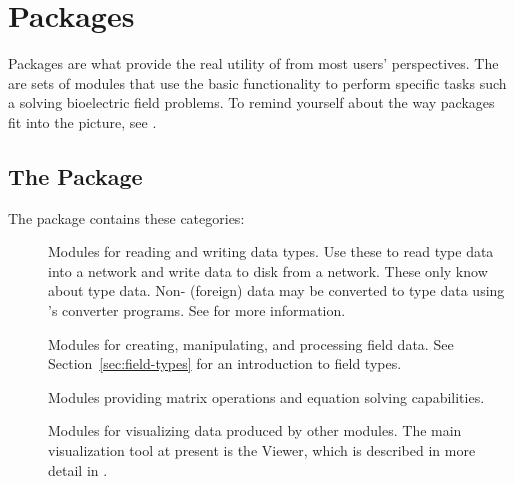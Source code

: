 %
%
%
%
%
%
\section{Packages}
\label{sec:packages}

Packages are what provide the real utility of \SR{} from most users'
perspectives.  The are sets of modules that use the basic \SR{}
functionality to perform specific tasks such a solving bioelectric field
problems.  To remind yourself about the way packages fit into the picture,
see .

\subsection{The \sr{} Package}
\label{sec:srpackage}


The \sr{} package contains these categories:

\begin{description}

\item[] Modules for reading and writing \sr{}
  data types.  Use these to read \sr{} type data into a network and write
  data to disk from a network.  These only know about \sr{} type data.
  Non-\sr{} (foreign) data may be converted to \sr{} type data using
  \sr{}'s converter programs.  See  for more information.

\item[] Modules for creating,
  manipulating, and processing field data.
  See Section~\ref{sec:field-types} for an introduction to \sr{} field
  types. 
\item[] Modules providing matrix operations and
  equation solving capabilities.
\item[] Modules for visualizing data produced by
  other modules.  The main visualization tool at present
  is the Viewer, which is described in more detail in
  .
\end{description}

